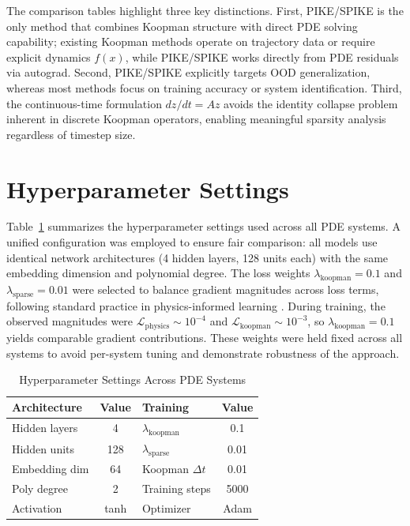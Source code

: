 \documentclass{article}
\theoremstyle{remark}
\begin{document}
The comparison tables highlight three key distinctions. First, PIKE/SPIKE is the only method that combines Koopman structure with direct PDE solving capability; existing Koopman methods operate on trajectory data or require explicit dynamics $f(x)$, while PIKE/SPIKE works directly from PDE residuals via autograd. Second, PIKE/SPIKE explicitly targets OOD generalization, whereas most methods focus on training accuracy or system identification. Third, the continuous-time formulation $dz/dt = Az$ avoids the identity collapse problem inherent in discrete Koopman operators, enabling meaningful sparsity analysis regardless of timestep size.

\FloatBarrier
\section{Hyperparameter Settings}
\label{app:hyperparameters}

Table~\ref{tab:hyperparameters} summarizes the hyperparameter settings used across all PDE systems. A unified configuration was employed to ensure fair comparison: all models use identical network architectures (4 hidden layers, 128 units each) with the same embedding dimension and polynomial degree. The loss weights $\lambda_{\text{koopman}} = 0.1$ and $\lambda_{\text{sparse}} = 0.01$ were selected to balance gradient magnitudes across loss terms, following standard practice in physics-informed learning \citep{raissi2019pinn, wang2021understanding}. During training, the observed magnitudes were $\mathcal{L}_{\text{physics}} \sim 10^{-4}$ and $\mathcal{L}_{\text{koopman}} \sim 10^{-3}$, so $\lambda_{\text{koopman}} = 0.1$ yields comparable gradient contributions. These weights were held fixed across all systems to avoid per-system tuning and demonstrate robustness of the approach.

\begin{table}[H]
\centering
\caption{Hyperparameter Settings Across PDE Systems}
\label{tab:hyperparameters}
\begin{tabular}{lc|lc}
\toprule
\textbf{Architecture} & \textbf{Value} & \textbf{Training} & \textbf{Value} \\
\midrule
Hidden layers & 4 & $\lambda_{\text{koopman}}$ & 0.1 \\
Hidden units & 128 & $\lambda_{\text{sparse}}$ & 0.01 \\
Embedding dim & 64 & Koopman $\Delta t$ & 0.01 \\
Poly degree & 2 & Training steps & 5000 \\
Activation & tanh & Optimizer & Adam \\
\bottomrule
\end{tabular}
\end{table}
\end{document}
